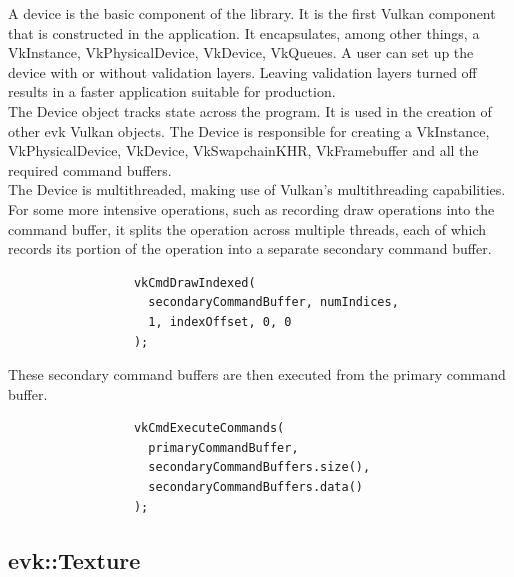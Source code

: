 \documentclass[12pt]{report}
\theoremstyle{definition}
\begin{document}
        A device is the basic component of the library. It is the first Vulkan
        component that is constructed in the application. It encapsulates,
        among other things, a VkInstance, VkPhysicalDevice, VkDevice, VkQueues.
        A user can set up the device with or without validation layers. Leaving
        validation layers turned off results in a faster application suitable
        for production. \\

        The Device object tracks state across the program. It is used in the
        creation of other evk Vulkan objects. The Device is responsible for
        creating a VkInstance, VkPhysicalDevice, VkDevice, VkSwapchainKHR, VkFramebuffer
        and all the required command buffers. \\

        The Device is multithreaded, making use of Vulkan's multithreading
        capabilities. For some more intensive operations, such as recording
        draw operations into the command buffer, it splits the operation
        across multiple threads, each of which records its portion of the
        operation into a separate secondary command buffer. \\

        \begin{figure}[H]
        \begin{verbatim}
            vkCmdDrawIndexed(
              secondaryCommandBuffer, numIndices,
              1, indexOffset, 0, 0
            );
        \end{verbatim}
        \end{figure}

        These secondary command buffers are then executed from the primary
        command buffer.

        \begin{figure}[H]
        \begin{verbatim}
            vkCmdExecuteCommands(
              primaryCommandBuffer,
              secondaryCommandBuffers.size(),
              secondaryCommandBuffers.data()
            );
        \end{verbatim}
        \end{figure}

      \subsection{evk::Texture}
\end{document}
